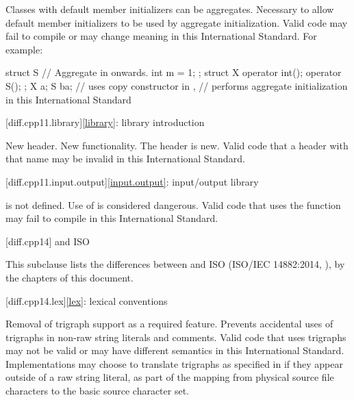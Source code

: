 \change
Classes with default member initializers can be aggregates.
\rationale
Necessary to allow default member initializers to be used
by aggregate initialization.
\effect
Valid \CppXI{} code may fail to compile or may change meaning in this International Standard.
For example:
\begin{codeblock}
struct S { // Aggregate in \CppXIV{} onwards.
  int m = 1;
};
struct X {
  operator int();
  operator S();
};
X a{};
S b{a};  // uses copy constructor in \CppXI{},
         // performs aggregate initialization in this International Standard
\end{codeblock}

[diff.cpp11.library]{\ref{library}: library introduction}

\change
New header.
\rationale
New functionality.
\effect
The \Cpp{} header  is new.
Valid \CppXI{} code that  a header with that name may be
invalid in this International Standard.

[diff.cpp11.input.output]{\ref{input.output}: input/output library}

\change
{} is not defined.
\rationale
Use of  is considered dangerous.
\effect
Valid \CppXI{} code that uses the  function may fail to compile
in this International Standard.

[diff.cpp14]{\Cpp{} and ISO \CppXIV{}}

\pnum
{}%
This subclause lists the differences between \Cpp{} and
ISO \CppXIV{} (ISO/IEC 14882:2014, ),
by the chapters of this document.

[diff.cpp14.lex]{\ref{lex}: lexical conventions}

%
\change
Removal of trigraph support as a required feature.
\rationale
Prevents accidental uses of trigraphs in non-raw string literals and comments.
\effect
Valid \CppXIV{} code that uses trigraphs may not be valid or may have different
semantics in this International Standard. Implementations may choose to
translate trigraphs as specified in \CppXIV{} if they appear outside of a raw
string literal, as part of the  mapping from physical source file characters to
the basic source character set.

